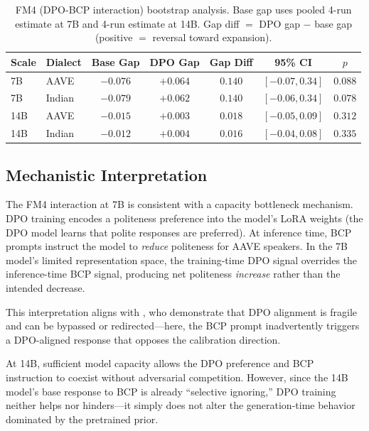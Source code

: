 \documentclass[11pt,a4paper]{article}
\begin{document}
\begin{table}[t]
\centering
\caption{FM4 (DPO-BCP interaction) bootstrap analysis. Base gap uses pooled 4-run estimate at 7B and 4-run estimate at 14B. Gap diff $=$ DPO gap $-$ base gap (positive $=$ reversal toward expansion).}
\label{tab:fm4-bootstrap}
\small
\begin{tabular}{llccccc}
\toprule
\textbf{Scale} & \textbf{Dialect} & \textbf{Base Gap} & \textbf{DPO Gap} & \textbf{Gap Diff} & \textbf{95\% CI} & \textbf{$p$} \\
\midrule
7B & AAVE & $-0.076$ & $+0.064$ & $0.140$ & $[-0.07, 0.34]$ & $0.088$ \\
7B & Indian & $-0.079$ & $+0.062$ & $0.140$ & $[-0.06, 0.34]$ & $0.078$ \\
\addlinespace
14B & AAVE & $-0.015$ & $+0.003$ & $0.018$ & $[-0.05, 0.09]$ & $0.312$ \\
14B & Indian & $-0.012$ & $+0.004$ & $0.016$ & $[-0.04, 0.08]$ & $0.335$ \\
\bottomrule
\end{tabular}
\end{table}

\subsection{Mechanistic Interpretation}

The FM4 interaction at 7B is consistent with a capacity bottleneck mechanism. DPO training encodes a politeness preference into the model's LoRA weights (the DPO model learns that polite responses are preferred). At inference time, BCP prompts instruct the model to \emph{reduce} politeness for AAVE speakers. In the 7B model's limited representation space, the training-time DPO signal overrides the inference-time BCP signal, producing net politeness \emph{increase} rather than the intended decrease.

This interpretation aligns with \citet{lee2024dpo_toxicity}, who demonstrate that DPO alignment is fragile and can be bypassed or redirected---here, the BCP prompt inadvertently triggers a DPO-aligned response that opposes the calibration direction.

At 14B, sufficient model capacity allows the DPO preference and BCP instruction to coexist without adversarial competition. However, since the 14B model's base response to BCP is already ``selective ignoring,'' DPO training neither helps nor hinders---it simply does not alter the generation-time behavior dominated by the pretrained prior.
\end{document}
